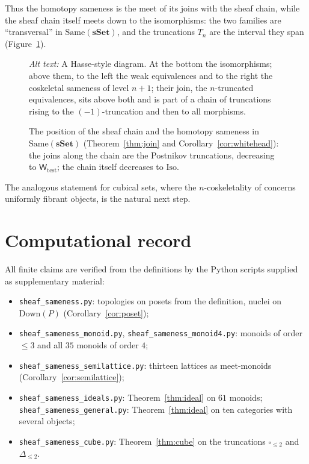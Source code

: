 \documentclass[11pt]{amsart}
\theoremstyle{definition}
\newcommand{\Same}{\mathrm{Same}}
\newcommand{\Mor}{\mathrm{Mor}}
\newcommand{\Iso}{\mathrm{Iso}}
\newcommand{\Down}{\mathrm{Down}}
\newcommand{\Wtest}{\mathsf{W}_{\mathrm{test}}}
\newcommand{\sset}{\mathbf{sSet}}
\newcommand{\cube}{\square}
\begin{document}
Thus the homotopy sameness is the meet of its joins with the sheaf chain,
while the sheaf chain itself meets down to the isomorphisms: the two families
are ``transversal'' in $\Same(\sset)$, and the truncations $T_n$ are the
interval they span (Figure~\ref{fig:lattice}).

\begin{figure}[ht]
\centering
{}
\caption{The position of the sheaf chain and the homotopy sameness in
$\Same(\sset)$ (Theorem~\ref{thm:join} and Corollary~\ref{cor:whitehead}):
the joins along the chain are the Postnikov truncations, decreasing to
$\Wtest$; the chain itself decreases to $\Iso$.}
\label{fig:lattice}
\par\smallskip\noindent\textit{Alt text:} A Hasse-style diagram. At the
bottom the isomorphisms; above them, to the left the weak equivalences and
to the right the coskeletal sameness of level $n+1$; their join, the
$n$-truncated equivalences, sits above both and is part of a chain of
truncations rising to the $(-1)$-truncation and then to all morphisms.
\end{figure} The analogous statement for cubical sets, where the
$n$-coskeletality of \cite{Cubes} concerns uniformly fibrant objects, is the
natural next step.

\section{Computational record}\label{sec:comp}
All finite claims are verified from the definitions by the Python scripts
supplied as supplementary material:
\begin{itemize}
\item \texttt{sheaf\_sameness.py}: topologies on posets from the definition,
nuclei on $\Down(P)$ (Corollary~\ref{cor:poset});
\item \texttt{sheaf\_sameness\_monoid.py}, \texttt{sheaf\_sameness\_monoid4.py}:
monoids of order $\le3$ and all $35$ monoids of order $4$;
\item \texttt{sheaf\_sameness\_semilattice.py}: thirteen lattices as
meet-monoids (Corollary~\ref{cor:semilattice});
\item \texttt{sheaf\_sameness\_ideals.py}: Theorem~\ref{thm:ideal} on $61$
monoids; \texttt{sheaf\_sameness\_general.py}: Theorem~\ref{thm:ideal} on ten
categories with several objects;
\item \texttt{sheaf\_sameness\_cube.py}: Theorem~\ref{thm:cube} on the
truncations $\cube_{\le2}$ and $\Delta_{\le2}$.
\end{itemize}
\end{document}

